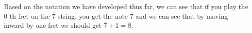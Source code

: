 \documentclass[preview]{standalone}
\begin{document}
\begin{center}
Based on the notation we have developed thus far, we can see that if you play the $0$-th fret on the $\overline{7}$ string, you get the note $\overline{7}$ and  we can see that by moving inward by one fret we should get $\overline{7} + 1 = \overline{8}$.
\end{center}
\end{document}
